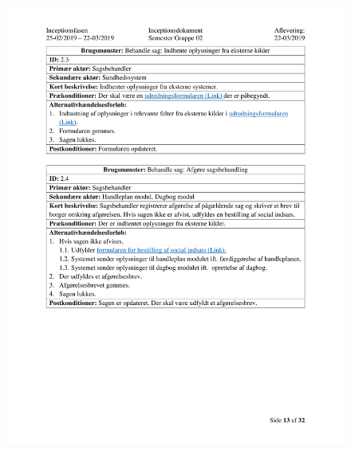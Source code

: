 \begin{figure}[hb]
  \includegraphics[scale = 0.33]{./PNG/Inceptions/Gruppe02+InceptionsDokument-14.jpg} 
\end{figure}


